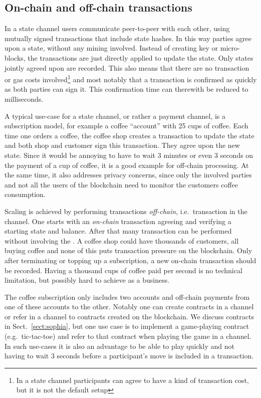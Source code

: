 \subsection{On-chain and off-chain transactions}

In a state channel users communicate peer-to-peer with
each other, using mutually signed transactions that include state
hashes. In this way parties agree upon a state, without any
mining involved. Instead of creating key or micro-blocks, the transactions are just
directly applied to update the state. Only states
jointly agreed upon are recorded. This also
means that there are no transaction or gas costs involved\footnote{In a state
channel participants can agree to have a kind of transaction cost, but it
is not the default setup} and most notably that a transaction
is confirmed as quickly as both parties can sign it. This confirmation
time can therewith be reduced to milliseconds.

A typical use-case for a state channel, or rather a payment channel, is a subscription model, for
example a coffee ``account'' with 25 cups of coffee. Each time one
orders a coffee, the coffee shop
creates a transaction to update the state and both shop
and customer sign this transaction. They agree upon the new state.
Since it would be annoying to have to wait 3 minutes or even 3 seconds
on the payment of a cup of coffee, it is a good example for off-chain
processing. At the same time, it also addresses privacy concerns,
since only the involved parties and not all the users of the
blockchain need to monitor the customers coffee consumption.

Scaling is achieved by performing transactions \textit{off-chain},
i.e.\ transaction in the channel. One starts with an \textit{on-chain}
transaction agreeing and verifying a starting state and balance. After
that many transaction can be performed without involving the
\blockchain. A coffee shop could have thousands of customers, all buying coffee and none of
this puts transaction pressure on the blockchain. Only after
terminating or topping up a subscription, a new on-chain
transaction should be recorded. Having a thousand cups of coffee paid
per second is no technical limitation, but possibly hard to achieve as
a business.

The coffee subscription only includes two accounts and off-chain
payments from one of these accounts to the other.
Notably one
can create contracts in a channel or refer in a channel to contracts
created on the blockchain. We discuss contracts in Sect.\
\ref{sect:sophia}, but one use case is to implement a game-playing
contract (e.g.\ tic-tac-toe) and refer to that contract when playing the
game in a channel. In such use-cases it is also an advantage to be
able to play quickly and not having to wait 3 seconds before a participant's move
is included in a transaction.

